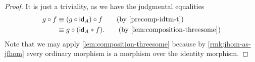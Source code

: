 \begin{proof}
It is just a triviality, as we have the judgmental equalities
\begin{align*}
\jcomp{}{f}{g}
& \jdeq
  \jcomp{}{f}{\jcomp{}{\idtm{A}}{g}}
  \tag{by \autoref{precomp-idtm-t}}
  \\
& \jdeq
  \jcomp{}{\jvcomp{}{\idtm{A}}{f}}{g}.
  \tag{by \autoref{lem:composition-threesome}}
\end{align*}
Note that we may apply \autoref{lem:composition-threesome} because by
\autoref{rmk:jhom-as-jfhom} every ordinary morphism is a morphism over the
identity morphism.
\end{proof}
